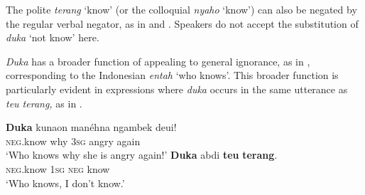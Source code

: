 \documentclass[output=paper]{langscibook}
\begin{document}
The polite \textit{terang} ‘know’ (or the colloquial \textit{nyaho} ‘know’) can also be negated by the regular verbal negator, as in  and . Speakers do not accept the substitution of \textit{duka} ‘not know’ here. 

 \ea\label{ex:sun:32}
    \z
\z 

\textit{Duka} has a broader function of appealing to general ignorance, as in , corresponding to the Indonesian \textit{entah} ‘who knows’. This broader function is particularly evident in expressions where \textit{duka} occurs in the same utterance as \textit{teu terang,} as in . 

 \ea\label{ex:sun:33}
    \ea\label{ex:sun:33a}
        \gll  \textbf{Duka} kunaon manéhna ngambek deui!\\ 
              \textsc{neg}.know why 3\textsc{sg} angry again\\
        \glt ‘Who knows why she is angry again!’
    \ex\label{ex:sun:33b}
        \gll  \textbf{Duka} abdi \textbf{teu} \textbf{terang}. \\
              \textsc{neg}.know 1\textsc{sg} \textsc{neg} know\\
        \glt ‘Who knows, I don’t know.’ 
    \z
\z 
\end{document}

